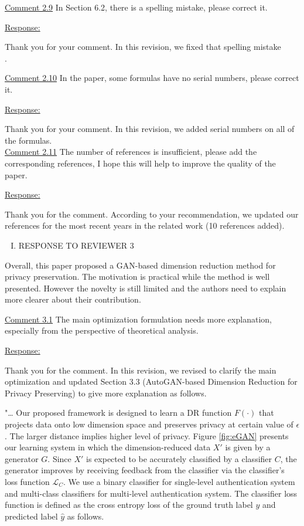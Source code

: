 \documentclass[]{elsarticle}
\begin{document}
 
\color{blue}
\underline{Comment 2.9}
In Section 6.2, there is a spelling mistake, please correct it. 

\color{black}
\underline{Response:}


Thank you for your comment. In this revision, we fixed that spelling mistake\\. 



\color{blue}
\underline{Comment 2.10}
In the paper, some formulas have no serial numbers, please correct it. 

\color{black}
\underline{Response:}


Thank you for your comment. In this revision, we added serial numbers on all of the formulas.\\


\color{blue}
\underline{Comment 2.11}  
The number of references is insufficient, please add the corresponding references, I hope this will help to improve the quality of the paper.

\color{black}
\underline{Response:}

Thank you for the comment. According to your recommendation, we updated our references
for the most recent years in the related work (10 references added). \\



\newpage
\begin{enumerate}[III.]
	\item RESPONSE TO REVIEWER 3
\end{enumerate}
\color{blue}
Overall, this paper proposed a GAN-based dimension reduction method for privacy preservation. The motivation is practical while the method is well presented. However the novelty is still limited and the authors need to explain more clearer about their contribution.

\underline{Comment 3.1}
The main optimization formulation needs more explanation, especially from the perspective of theoretical analysis.

\color{black}
\underline{Response:}


Thank you for the comment. In this revision, we revised to clarify the main optimization and updated Section 3.3 (AutoGAN-based Dimension Reduction for Privacy Preserving) to give more explanation as follows.


	"\dots
	Our proposed framework is designed to learn a DR function $F(\cdot)$ that projects data onto low dimension space and preserves privacy at certain value of $\epsilon$. The larger distance implies higher level of privacy. Figure \ref{fig:eGAN} presents our learning system in which the dimension-reduced data $X'$ is given by a generator $G$. Since $X'$ is expected to be accurately classified by a classifier $C$, the generator improves by receiving feedback from the classifier via the classifier's loss function $\mathcal{L}_C$. We use a binary classifier for single-level authentication system and multi-class classifiers for multi-level authentication system. The classifier loss function is defined as the cross entropy loss of the ground truth label $y$ and predicted label $\hat y$ as follows.
	
\end{document}
